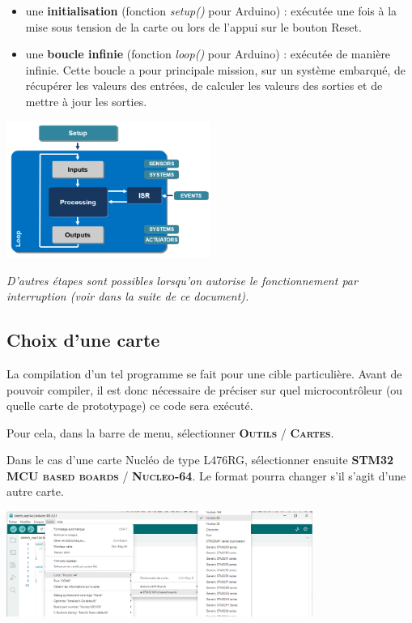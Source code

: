 \documentclass[a4paper,11pt,titlepage]{article} %
\begin{document}
\begin{itemize}
	\item une \textbf{initialisation} (fonction \textsl{setup()} pour Arduino) : exécutée une fois à la mise sous tension de la carte ou lors de l'appui sur le bouton Reset.
	\item une \textbf{boucle infinie} (fonction \textsl{loop()} pour Arduino) : exécutée de manière infinie. Cette boucle a pour principale mission, sur un système embarqué, de récupérer les valeurs des entrées, de calculer les valeurs des sorties et de mettre à jour les sorties.
\end{itemize}

\begin{center}
	\includegraphics[width=0.5\textwidth]{images/arduino_program_structure.png}
\end{center}

\textit{D'autres étapes sont possibles lorsqu'on autorise le fonctionnement par interruption (voir dans la suite de ce document).}



\subsection{Choix d'une carte}

La compilation d'un tel programme se fait pour une cible particulière. Avant de pouvoir compiler, il est donc nécessaire de préciser sur quel microcontrôleur (ou quelle carte de prototypage) ce code sera exécuté.

Pour cela, dans la barre de menu, sélectionner \textsc{\textbf{Outils} / \textbf{Cartes}}.

Dans le cas d'une carte Nucléo de type L476RG, sélectionner ensuite \textsc{\textbf{STM32 MCU based boards} / \textbf{Nucleo-64}}. Le format pourra changer s'il s'agit d'une autre carte.

\begin{center}
	\includegraphics[width=0.75\textwidth]{images/arduino_outils_cartes_nucleo64.png}
\end{center}
\end{document}
